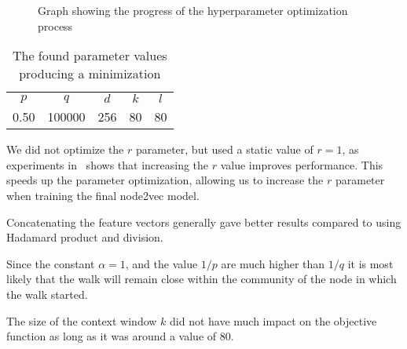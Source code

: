 \begin{figure}%
  \centering
\caption[Hyperparameter optimization]{Graph showing the progress of the hyperparameter optimization process}%
\label{fig:spearmint}%
\end{figure}

\begin{table}%
\centering
\begin{tabular}{ccccc}
\toprule
$p$  & $q$     & $d$ & $k$ & $l$ \\
\num{0.50} & \num{100000} & 256 & 80  & 80 \\
\bottomrule
\end{tabular}
\caption[The found parameter values producing a minimization]{The found parameter values producing a minimization}%
\label{tab:paramopt_goodvalues}%
\end{table}

We did not optimize the $r$ parameter, but used a static value of $r=1$, as experiments in~\cite{node2vec} shows that increasing the $r$ value improves performance. This speeds up the parameter optimization, allowing us to increase the $r$ parameter when training the final node2vec model.

Concatenating the feature vectors generally gave better results compared to using Hadamard product and division.

Since the constant $\alpha = 1$, and the value $1/p$ are much higher than $1/q$ it is most likely that the walk will remain close within the community of the node in which the walk started.

The size of the context window $k$ did not have much impact on the objective function as long as it was around a value of $80$.

